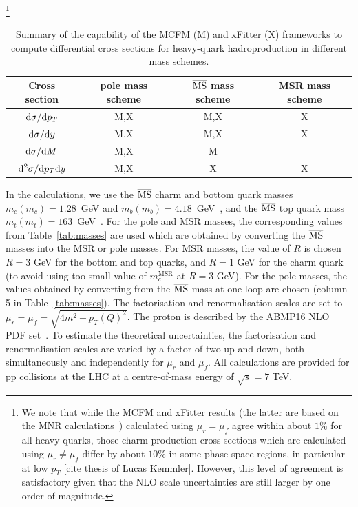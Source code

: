 \documentclass[12pt,a4paper]{article}
\newcommand{\msbar}{\ensuremath{\overline{\rm MS}}\xspace}
\newcommand{\msrm}[1][]{\ensuremath{m_{#1}^{\text{MSR}}}\xspace}
\begin{document}
\footnote{We note that while the MCFM and xFitter results (the latter are based on the MNR calculations~\cite{Mangano:1991jk}) calculated using $\mu_r=\mu_f$ agree within about $1\%$ for all heavy quarks, those charm production cross sections which are calculated using $\mu_r \ne \mu_f$ differ by about $10\%$ in some phase-space regions, in particular at low $p_T$ [cite thesis of Lucas Kemmler]. However, this level of agreement is satisfactory given that the NLO scale uncertainties are still larger by one order of magnitude.}

\begin{table}
\renewcommand*{\arraystretch}{1.5}
\textwidth
\centering
    \begin{tabular}{|c|ccc|}
        \hline
       Cross section & pole mass scheme & \msbar mass scheme & MSR mass scheme \\
        \hline
        ${{\rm d}\sigma}/{{\rm d}p_T}$ & M,X & M,X & X \\
        ${{\rm d}\sigma}/{{\rm d}y}$ & M,X & M,X & X \\
        ${{\rm d}\sigma}/{{\rm d}M}$ & M,X & M & -- \\
        ${{\rm d}^2\sigma}/{{\rm d}p_T{\rm d}y}$ & M,X & X & X \\
        \hline
    \end{tabular}
\caption{Summary of the capability of the MCFM (M) and xFitter (X) frameworks to compute differential cross sections for heavy-quark hadroproduction in different mass schemes.}
\label{tab:xsec}
\end{table}

  In the calculations, we use the \msbar charm and bottom quark masses $m_c(m_c) = 1.28$~GeV and $m_b(m_b) = 4.18$~GeV~\cite{Tanabashi:2018oca}, and the \msbar top quark mass $m_t(m_t) = 163$~GeV~\cite{Aad:2019mkw,Hoang:2008yj}. For the pole and MSR masses, the corresponding values from Table~\ref{tab:masses} are used which are obtained by converting the \msbar masses into the MSR or pole masses. For MSR masses, the value of $R$ is chosen $R=3$ GeV for the bottom and top quarks, and $R=1$ GeV for the charm quark (to avoid using too small value of $\msrm[c]$ at $R=3$ GeV). 
  For the pole masses, the values obtained by converting from the \msbar mass at one loop are chosen (column 5 in Table~\ref{tab:masses}).
  The factorisation and renormalisation scales are set to $\mu_r = \mu_f = \sqrt{4m^2+p_T(Q)^2}$.
  The proton is described by the ABMP16 NLO PDF set~\cite{Alekhin:2018pai}. 
  To estimate the theoretical uncertainties, the factorisation and renormalisation scales are varied by a factor of two up and down, both simultaneously and independently for $\mu_r$ and $\mu_f$. All calculations are provided for pp collisions at the LHC at a centre-of-mass energy of $\sqrt{s} = 7$ TeV.
\end{document}
